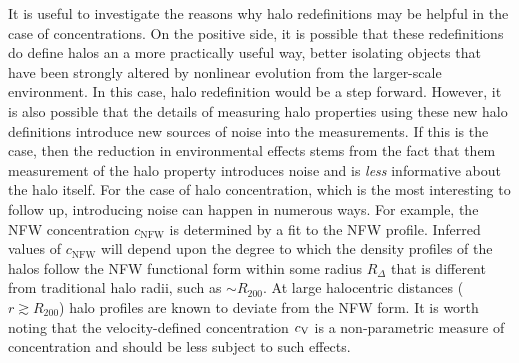 \documentclass[usenatbib]{mnras}
\begin{document}
It is useful to investigate the reasons why halo redefinitions may be helpful in the case 
of concentrations. On the positive side, it is possible that these redefinitions do define 
halos an a more practically useful way, better isolating objects that have been strongly 
altered by nonlinear evolution from the larger-scale environment. In this case, halo redefinition 
would be a step forward. However, it is also possible that the details of measuring halo 
properties using these new halo definitions introduce new sources of noise into the 
measurements. If this is the case, then the reduction in environmental effects stems 
from the fact that them measurement of the halo property 
introduces noise and is {\em less} informative about the halo itself. 
For the case of halo concentration, which is the most interesting to 
follow up, introducing noise can happen in numerous ways. For example, 
the NFW concentration $c_{\mathrm{NFW}}$ is determined by a fit to the 
NFW profile. Inferred values of $c_{\mathrm{NFW}}$ will depend upon 
the degree to which the density profiles of the halos follow the NFW 
functional form within some radius $R_{\Delta}$ that is different from 
traditional halo radii, such as $\sim R_{200}$. At large halocentric 
distances ($r \gtrsim R_{200}$) halo profiles are known to deviate 
from the NFW form. It is worth noting that the velocity-defined concentration 
$c_{\rm V}$ is a non-parametric measure of concentration and should be 
less subject to such effects. 


\end{document}
